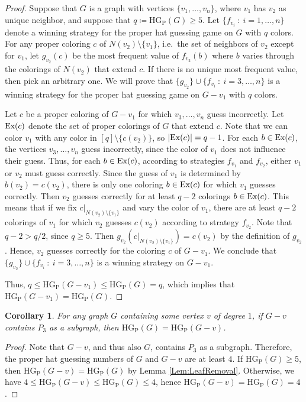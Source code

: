\documentclass[a4paper,11pt]{amsproc}
\theoremstyle{plain}
\newtheorem{Corollary} [Theorem] {Corollary}
\theoremstyle{definition}
\newcommand{\HGP}{\mathrm{HG_{P}}}
\newcommand{\Ex}{\textnormal{Ex}}
\begin{document}
\begin{proof}
Suppose that $G$ is a graph with vertices $\{v_1,\dots,v_n\}$, where $v_1$ has $v_2$ as unique neighbor, and suppose that $q \coloneq \HGP(G) \geq 5$.
Let $\{ f_{v_i} \: : \: i = 1, \dots, n \}$ denote a winning strategy for the proper hat guessing game on $G$ with $q$ colors.
For any proper coloring $c$ of $N(v_2) \setminus \{v_1\}$, i.e.\ the set of neighbors of $v_2$ except for $v_1$, let $g_{v_2}(c)$ be the most frequent value of $f_{v_2}(b)$ where $b$ varies through the colorings of $N(v_2)$ that extend $c$.
If there is no unique most frequent value, then pick an arbitrary one.
We will prove that $\{g_{v_2}\} \cup \{f_{v_i} \: : \: i = 3, \dots, n\}$ is a winning strategy for the proper hat guessing game on $G-v_1$ with $q$ colors.

Let $c$ be a proper coloring of $G - v_1$ for which $v_3, \dots, v_n$ guess incorrectly.
Let $\Ex(c)$ denote the set of proper colorings of $G$ that extend $c$.
Note that we can color $v_1$ with any color in $[q] \setminus \{c(v_2)\}$, so $|\Ex(c)| = q-1$.
For each $b \in \Ex(c)$, the vertices $v_3, \dots, v_n$ guess incorrectly, since the color of $v_1$ does not influence their guess.
Thus, for each $b \in \Ex(c)$, according to strategies $f_{v_1}$ and $f_{v_2}$, either $v_1$ or $v_2$ must guess correctly.
Since the guess of $v_1$ is determined by $b(v_2) = c(v_2)$, there is only one coloring $b \in \Ex(c)$ for which $v_1$ guesses correctly.
Then $v_2$ guesses correctly for at least $q-2$ colorings $b \in \Ex(c)$.
This means that if we fix $c|_{N(v_2) \setminus \{v_1\}}$ and vary the color of $v_1$, there are at least $q-2$ colorings of $v_1$ for which $v_2$ guesses $c(v_2)$ according to strategy $f_{v_2}$.
Note that $q-2 > q/2$, since $q \geq 5$.
Then $g_{v_2}(c|_{N(v_2) \setminus \{v_1\}}) = c(v_2)$ by the definition of $g_{v_2}$.
Hence, $v_2$ guesses correctly for the coloring $c$ of $G - v_1$.
We conclude that $\{g_{v_2}\} \cup \{f_{v_i} \: : \: i = 3, \dots, n\}$ is a winning strategy on $G - v_1$.

Thus, $q \leq \HGP(G-v_1) \leq \HGP(G) = q$, which implies that $\HGP(G - v_1) = \HGP(G)$.
\end{proof}

\begin{Corollary}\label{Cor:LeafRemoval}
 For any graph $G$ containing some vertex $v$ of degree $1$, if $G-v$ contains $P_3$ as a subgraph, then $\HGP(G) = \HGP(G - v)$.
\end{Corollary}

\begin{proof}
 Note that $G-v$, and thus also $G$, contains $P_3$ as a subgraph.
 Therefore, the proper hat guessing numbers of $G$ and $G-v$ are at least $4$.
 If $\HGP(G) \geq 5$, then $\HGP(G - v) = \HGP(G)$ by Lemma \ref{Lem:LeafRemoval}.
 Otherwise, we have $4 \leq \HGP(G-v) \leq \HGP(G) \leq 4$, hence $\HGP(G-v) = \HGP(G) = 4$.
\end{proof}
\end{document}
